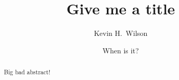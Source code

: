 \title{Give me a title}
\author{Kevin H.~Wilson}
\date{When is it?}

\maketitle

\begin{abstract}
  Big bad abstract!
\end{abstract}




